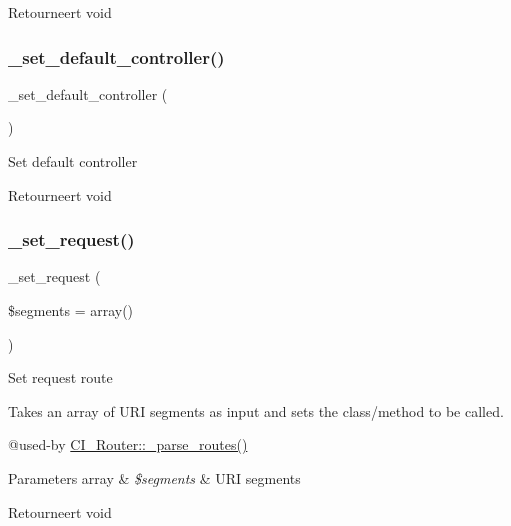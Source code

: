 \begin{DoxyReturn}{Retourneert}
void 
\end{DoxyReturn}
\mbox{\label{class_c_i___router_a86b13067b062022251d2c7ecb4fb9492}} 
\subsubsection{\texorpdfstring{\_set\_default\_controller()}{\_set\_default\_controller()}}
{\footnotesize\ttfamily \+\_\+set\+\_\+default\+\_\+controller (\begin{DoxyParamCaption}{ }\end{DoxyParamCaption})\hspace{0.3cm}{\ttfamily [protected]}}

Set default controller

\begin{DoxyReturn}{Retourneert}
void 
\end{DoxyReturn}
\mbox{\label{class_c_i___router_a92b8b486926e4dea5fee4d71f80a472a}} 
\subsubsection{\texorpdfstring{\_set\_request()}{\_set\_request()}}
{\footnotesize\ttfamily \+\_\+set\+\_\+request (\begin{DoxyParamCaption}\item[{}]{\$segments = {\ttfamily array()} }\end{DoxyParamCaption})\hspace{0.3cm}{\ttfamily [protected]}}

Set request route

Takes an array of U\+RI segments as input and sets the class/method to be called.

@used-\/by \mbox{\hyperlink{class_c_i___router_a55a42fae865d03334b49baa5a5a6bd0b}{C\+I\+\_\+\+Router\+::\+\_\+parse\+\_\+routes()}} 
\begin{DoxyParams}[1]{Parameters}
array & {\em \$segments} & U\+RI segments \\
\hline
\end{DoxyParams}
\begin{DoxyReturn}{Retourneert}
void 
\end{DoxyReturn}
\mbox{\label{class_c_i___router_abc9f3e0d48cec66f93a7f103c9a65892}} 
